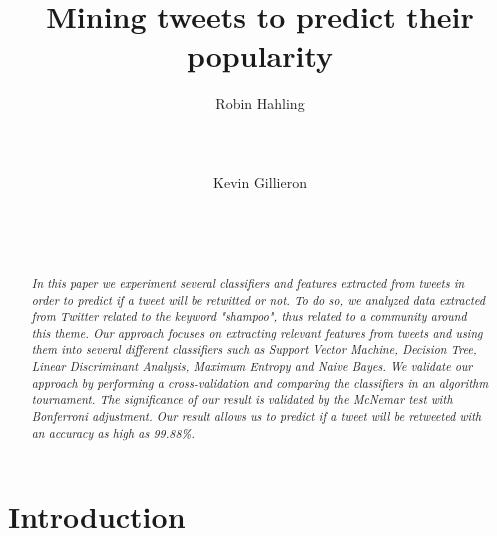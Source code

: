 \documentclass{sigchi}
\newcommand\tabhead[1]{\small\textbf{#1}}
\begin{document}
\title{Mining tweets to predict their popularity}

\author{
  \alignauthor Robin Hahling\\
    \\
    \\
    \\
  \alignauthor Kevin Gillieron\\
    \\
    \\
    \\
}

\maketitle

\begin{abstract}
\textit{
In this paper we experiment several classifiers and features extracted from
tweets in order to predict if a tweet will be retwitted or not.
To do so, we analyzed data extracted from Twitter related to the keyword
"shampoo", thus related to a community around this theme.
Our approach focuses on extracting relevant features from tweets and using them
into several different classifiers such as Support Vector Machine, Decision
Tree, Linear Discriminant Analysis, Maximum Entropy and Naive Bayes.
We validate our approach by performing a cross-validation and comparing the
classifiers in an algorithm tournament. The significance of our result is
validated by the McNemar test with Bonferroni adjustment.
Our result allows us to predict if a tweet will be retweeted with an accuracy as
high as 99.88\%.
}
\end{abstract}

\section{Introduction}

% 
\end{document}
